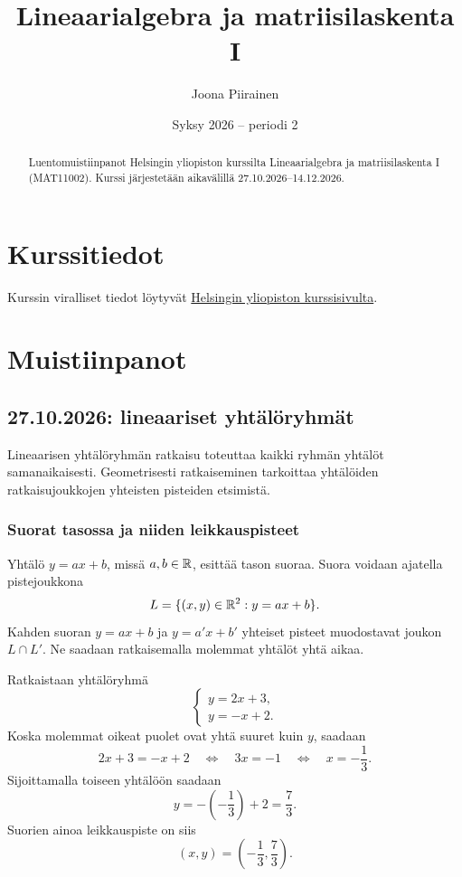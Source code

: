 \documentclass[11pt,a4paper]{amsart}
\title{Lineaarialgebra ja matriisilaskenta I}
\author{Joona Piirainen}
\date{Syksy 2026 -- periodi 2}
\begin{document}
\begin{abstract}
  Luentomuistiinpanot Helsingin yliopiston kurssilta
  Lineaarialgebra ja matriisilaskenta I (MAT11002).
  Kurssi järjestetään aikavälillä 27.10.2026--14.12.2026.
\end{abstract}

\maketitle

\tableofcontents

\section{Kurssitiedot}

Kurssin viralliset tiedot löytyvät
\href{https://studies.helsinki.fi/kurssit/opintojakso/otm-0a7d069a-f394-4a4a-8009-ab28a38e4419/MAT11002}{Helsingin
yliopiston kurssisivulta}.

\section{Muistiinpanot}

\subsection{27.10.2026: lineaariset yhtälöryhmät}

Lineaarisen yhtälöryhmän ratkaisu toteuttaa kaikki ryhmän yhtälöt
samanaikaisesti. Geometrisesti ratkaiseminen tarkoittaa yhtälöiden
ratkaisujoukkojen yhteisten pisteiden etsimistä.

\subsubsection*{Suorat tasossa ja niiden leikkauspisteet}

Yhtälö $y=ax+b$, missä $a,b\in\mathbb{R}$, esittää tason suoraa.
Suora voidaan ajatella pistejoukkona
\[
  L=\{(x,y)\in\mathbb{R}^2:y=ax+b\}.
\]
Kahden suoran $y=ax+b$ ja $y=a'x+b'$ yhteiset pisteet muodostavat
joukon $L\cap L'$. Ne saadaan ratkaisemalla molemmat yhtälöt yhtä aikaa.

\begin{example}
  Ratkaistaan yhtälöryhmä
  \[
    \begin{cases}
      y=2x+3,\\
      y=-x+2.
    \end{cases}
  \]
  Koska molemmat oikeat puolet ovat yhtä suuret kuin $y$, saadaan
  \[
    2x+3=-x+2
    \quad\Longleftrightarrow\quad
    3x=-1
    \quad\Longleftrightarrow\quad
    x=-\frac13.
  \]
  Sijoittamalla toiseen yhtälöön saadaan
  \[
    y=-\left(-\frac13\right)+2=\frac73.
  \]
  Suorien ainoa leikkauspiste on siis
  \[
    \boxed{(x,y)=\left(-\frac13,\frac73\right).}
  \]
\end{example}
\end{document}
